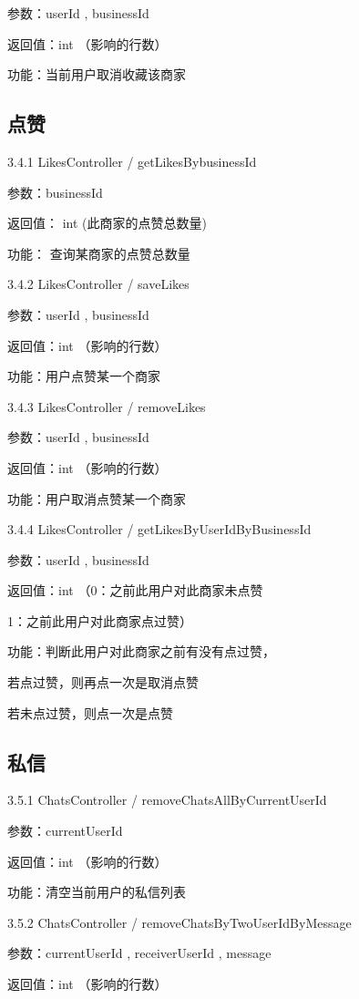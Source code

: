     参数：userId , businessId

    返回值：int （影响的行数）

    功能：当前用户取消收藏该商家
    \subsection{点赞}

    3.4.1 LikesController / getLikesBybusinessId

    参数：businessId

    返回值： int (此商家的点赞总数量)

    功能： 查询某商家的点赞总数量

    3.4.2 LikesController / saveLikes

    参数：userId , businessId

    返回值：int （影响的行数）

    功能：用户点赞某一个商家

    3.4.3 LikesController / removeLikes

    参数：userId , businessId

    返回值：int （影响的行数）

    功能：用户取消点赞某一个商家

    3.4.4 LikesController / getLikesByUserIdByBusinessId

    参数：userId , businessId

    返回值：int （0：之前此用户对此商家未点赞

    1：之前此用户对此商家点过赞）

    功能：判断此用户对此商家之前有没有点过赞，

    若点过赞，则再点一次是取消点赞

    若未点过赞，则点一次是点赞
    \subsection{私信}

    3.5.1 ChatsController / removeChatsAllByCurrentUserId

    参数：currentUserId

    返回值：int （影响的行数）

    功能：清空当前用户的私信列表

    3.5.2 ChatsController / removeChatsByTwoUserIdByMessage

    参数：currentUserId , receiverUserId , message

    返回值：int （影响的行数）

